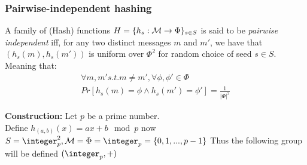 \subsubsection{Pairwise-independent hashing}

\begin{definition}
    A family of (Hash) functions $H=\{h_s:\mathcal{M} \to \Phi\}_{s\in S}$ is said to be \emph{pairwise independent} iff, for any two distinct messages $m$ and $m'$, we have that $(h_s(m),h_s(m'))$ is uniform over $\Phi^2$ for random choice of seed $s \in S$. Meaning that:
    \begin{gather*}
        \forall m,m' s.t. m\neq m',\forall \phi,\phi' \in \Phi \\
        Pr[h_s(m)=\phi \wedge h_s(m')=\phi']=\frac{1}{|\Phi|^2}
    \end{gather*}
\end{definition}

\textbf{Construction: } Let $p$ be a prime number.\\
Define $h_{(a,b)}(x)=ax+b \mod p$ now $S=\integer_p^2, \M=\Phi=\integer_p=\{0,1,...,p-1\}$
Thus the following group will be defined $(\integer_p,+)$

